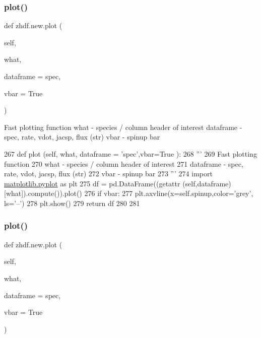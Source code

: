 \subsubsection{\texorpdfstring{plot()}{plot()}\hspace{0.1cm}{\footnotesize\ttfamily [1/2]}}
{\footnotesize\ttfamily def zhdf.\+new.\+plot (\begin{DoxyParamCaption}\item[{}]{self,  }\item[{}]{what,  }\item[{}]{dataframe = {\ttfamily \textquotesingle{}spec\textquotesingle{}},  }\item[{}]{vbar = {\ttfamily True} }\end{DoxyParamCaption})}

\begin{DoxyVerb}Fast plotting function
what - species / column header of interest
dataframe - spec, rate, vdot, jacsp, flux (str)
vbar - spinup bar
\end{DoxyVerb}
 
\begin{DoxyCode}
267     \textcolor{keyword}{def }plot (self, what, dataframe = 'spec',vbar=True ):
268         \textcolor{stringliteral}{'''}
269 \textcolor{stringliteral}{        Fast plotting function}
270 \textcolor{stringliteral}{        what - species / column header of interest}
271 \textcolor{stringliteral}{        dataframe - spec, rate, vdot, jacsp, flux (str)}
272 \textcolor{stringliteral}{        vbar - spinup bar}
273 \textcolor{stringliteral}{        '''}
274         \textcolor{keyword}{import} \mbox{\hyperlink{namespacematplotlib_1_1pyplot}{matplotlib.pyplot}} \textcolor{keyword}{as} plt
275         df = pd.DataFrame((getattr (self,dataframe)[what]).compute()).plot()
276         \textcolor{keywordflow}{if} vbar:
277             plt.axvline(x=self.spinup,color=\textcolor{stringliteral}{'grey'}, ls=\textcolor{stringliteral}{'--'})
278         plt.show()
279         \textcolor{keywordflow}{return} df
280 
281 
\end{DoxyCode}
\mbox{\label{classzhdf_1_1new_a9745f192f8c6f7e375a6fada1f44525a}} 
\subsubsection{\texorpdfstring{plot()}{plot()}\hspace{0.1cm}{\footnotesize\ttfamily [2/2]}}
{\footnotesize\ttfamily def zhdf.\+new.\+plot (\begin{DoxyParamCaption}\item[{}]{self,  }\item[{}]{what,  }\item[{}]{dataframe = {\ttfamily \textquotesingle{}spec\textquotesingle{}},  }\item[{}]{vbar = {\ttfamily True} }\end{DoxyParamCaption})}

